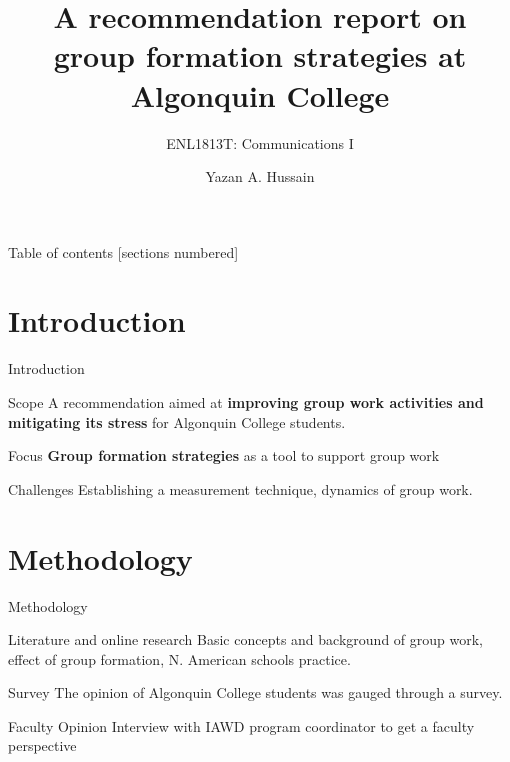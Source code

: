 \documentclass[12pt,table,aspectratio=169]{beamer}
\title{A recommendation report on group formation strategies at Algonquin College}
\subtitle{ENL1813T: Communications I}
\date{}
\author{Yazan A. Hussain}
\institute{IAWD - Algonquin College}
\begin{document}
\maketitle

\begin{frame}{Table of contents}
  [sections numbered]
  \tableofcontents[hideallsubsections]
\end{frame}

\section{Introduction}

\begin{frame}[fragile]{Introduction}
        \begin{alertblock}{Scope}
        A recommendation aimed at \textbf{improving group work activities and mitigating its stress} for Algonquin College students.
        \end{alertblock}
        \begin{alertblock}{Focus} \textbf{Group formation strategies} as a tool to support group work
        \end{alertblock}
        \begin{alertblock}{Challenges}
        Establishing a measurement technique, dynamics of group work. %
    \end{alertblock}
\end{frame}
\section{Methodology}
\begin{frame}[fragile]{Methodology}
    \item
    \begin{alertblock}{Literature and online research}
        Basic concepts and background of group work, effect of group formation, N. American schools practice.
    \end{alertblock}
    \vspace{1ex}
    \begin{alertblock}{Survey}
        The opinion of Algonquin College students was gauged through a survey.\\
    \end{alertblock}
    \vspace{1ex}
    \begin{alertblock}{Faculty Opinion}
        Interview with IAWD program coordinator to get a faculty perspective\\
    \end{alertblock}
\end{frame}
\end{document}
